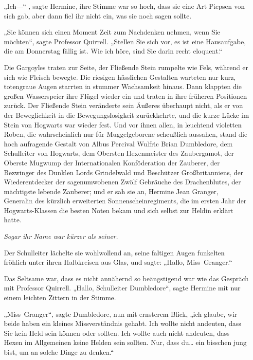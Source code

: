 {„Ich—“ , sagte Hermine, ihre Stimme war so hoch, dass sie eine Art Piepsen von sich gab, aber dann fiel ihr nicht ein, was sie noch sagen sollte.

„Sie können sich einen Moment Zeit zum Nachdenken nehmen, wenn Sie möchten“, sagte Professor Quirrell. „Stellen Sie sich vor, es ist eine Hausaufgabe, die am Donnerstag fällig ist. Wie ich höre, sind Sie darin recht eloquent.“

Die Gargoyles traten zur Seite, der Fließende Stein rumpelte wie Fels, während er sich wie Fleisch bewegte. Die riesigen hässlichen Gestalten warteten nur kurz, totengraue Augen starrten in stummer Wachsamkeit hinaus. Dann klappten die großen Wasserspeier ihre Flügel wieder ein und traten in ihre früheren Positionen zurück. Der Fließende Stein veränderte sein Äußeres überhaupt nicht, als er von der Beweglichkeit in die Bewegungslosigkeit zurückkehrte, und die kurze Lücke im Stein von Hogwarts war wieder fest. Und vor ihnen allen, in leuchtend violetten Roben, die wahrscheinlich nur für Muggelgeborene scheußlich aussahen, stand die hoch aufragende Gestalt von Albus Percival Wulfric Brian Dumbledore, dem Schulleiter von Hogwarts, dem Obersten Hexenmeister des Zaubergamot, der Oberste Mugwump der Internationalen Konföderation der Zauberer, der Bezwinger des Dunklen Lords Grindelwald und Beschützer Großbritanniens, der Wiederentdecker der sagenumwobenen Zwölf Gebräuche des Drachenblutes, der mächtigste lebende Zauberer; und er sah sie an, Hermine Jean Granger, Generalin des kürzlich erweiterten Sonnenscheinregiments, die im ersten Jahr der Hogwarts-Klassen die besten Noten bekam und sich selbst zur Heldin erklärt hatte.

\emph{Sogar ihr Name war kürzer als seiner.}

Der Schulleiter lächelte sie wohlwollend an, seine faltigen Augen funkelten fröhlich unter ihren Halbkreisen aus Glas, und sagte: „Hallo, Miss~Granger.“

Das Seltsame war, dass es nicht annähernd so beängstigend war wie das Gespräch mit Professor Quirrell. „Hallo, Schulleiter Dumbledore“, sagte Hermine mit nur einem leichten Zittern in der Stimme.

„Miss~Granger“, sagte Dumbledore, nun mit ernsterem Blick, „ich glaube, wir beide haben ein kleines Missverständnis gehabt. Ich wollte nicht andeuten, dass Sie kein Held sein können oder sollten. Ich wollte auch nicht andeuten, dass Hexen im Allgemeinen keine Helden sein sollten. Nur, dass du… ein bisschen jung bist, um an solche Dinge zu denken.“

}
